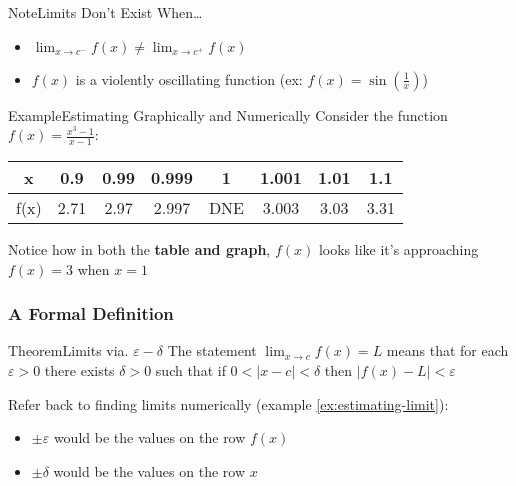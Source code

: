 \documentclass{MathNotes}
\newenvironment{example}[1]{\begin{BlueBox}{Example}{#1}}{\end{BlueBox}}
\newenvironment{note}[1]{\begin{YellowBox}{Note}{#1}}{\end{YellowBox}}
\newenvironment{theorem}[1]{\begin{GrayBox}{Theorem}{#1}}{\end{GrayBox}}
\begin{document}
\begin{note}{Limits Don't Exist When\ldots}\label{note:limit-doesnt-exist-when}
	\begin{itemize}
		\item $\lim_{x\to c^-}f(x)\neq \lim_{x\to c^+}f(x)$
		\item $f(x)$ is a violently oscillating function (ex: $f(x)=\sin\left(\frac{1}{x}\right)$)
	\end{itemize}
\end{note}

\begin{example}{Estimating Graphically and Numerically}\label{ex:estimating-limit}
	Consider the function $f(x)=\frac{x^3-1}{x-1}$:
	\begin{center}
		

		\begin{tabular}{ |c||c|c|c|c|c|c|c| }
			\hline
			x    & 0.9  & 0.99 & 0.999 & 1   & 1.001 & 1.01 & 1.1  \\
			\hline
			f(x) & 2.71 & 2.97 & 2.997 & DNE & 3.003 & 3.03 & 3.31 \\
			\hline
		\end{tabular}
	\end{center}

	Notice how in both the \textbf{table and graph}, $f(x)$ looks like it's
	approaching $f(x)=3$ when $x=1$
\end{example}

\newpage
\subsubsection{A Formal Definition}\label{sec:formal-def-limit}

\begin{multicols}{2}
	\begin{theorem}{Limits via. $\varepsilon - \delta$}\label{th:limit-def}
		The statement $\lim_{x\to c}f(x)=L$ means that for each
		$\varepsilon > 0$ there exists $ \delta>0 $ such that if
		$0<\lvert x-c \rvert < \delta$ then $\lvert f(x)-L \rvert < \varepsilon$
	\end{theorem}

	\centering
	
\end{multicols}
Refer back to finding limits numerically (example \ref{ex:estimating-limit}):
\begin{itemize}
	\item $\pm\varepsilon$ would be the values on the row $f(x)$
	\item $\pm\delta$ would be the values on the row $x$
\end{itemize}
\end{document}
